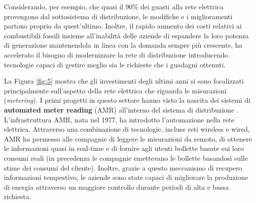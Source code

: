 Considerando, per esempio, che quasi il 90\% dei guasti alla rete elettrica provengono dal sottosistema di distribuzione, le modifiche e i miglioramenti partono proprio da quest'ultimo. Inoltre, il rapido aumento dei costi relativi ai combustibili fossili insieme all'inabilità delle aziende di espandere la loro potenza di generazione mantenendola in linea con la domanda sempre più crescente, ha accelerato il bisogno di modernizzare la rete di distribuzione introducendo tecnologie capaci di gestire meglio sia le richieste che i guadagni ottenuti. \newline
\begin{figure}[h]
\end{figure}
\newline
La Figura \ref{fig:5} mostra che gli investimenti degli ultimi anni si sono focalizzati principalmente sull'aspetto della rete elettrica che riguarda le misurazioni (\textit{metering}). I primi progetti in questo settore hanno visto la nascita dei sistemi di \textbf{automated meter reading} (AMR) all'interno del sistema di distribuzione \cite{securingSG}. \newline
L'infrastruttura AMR, nata nel 1977, ha introdotto l'automazione nella rete elettrica. Attraverso una combinazione di tecnologie, incluse reti wireless e wired,   AMR ha permesso alle compagnie di leggere le misurazioni da remoto, di ottenere le informazioni quasi in real-time e di fornire agli utenti bollette basate sui loro consumi reali (in precedenza le compagnie emettevano le bollette basandosi sulle stime dei consumi del cliente).  \newline Inoltre, grazie a questo meccanismo di recupero informazioni tempestivo, le aziende sono state capaci di migliorare la produzione di energia attraverso un maggiore controllo durante periodi di alta e bassa richiesta. \newline \newline
